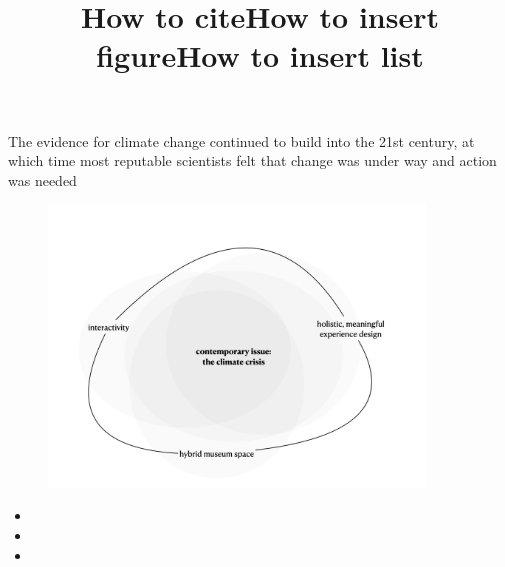 

\title{How to cite}
The evidence for climate change continued to build into the 21st century, at which time most reputable scientists felt that change was under way and action was needed \cite{hebda_museums_2007}

\title{How to insert figure}

\begin{figure}[h]
\includegraphics[width=10cm]{pictures/problem_sphere.png}
\caption{}
\autocite[]{}
\centering 
\end{figure}


\title{How to insert list}

\begin{itemize}
    \item 
    \item
    \item
\end{itemize}



\newpage
\ %
\newpage

